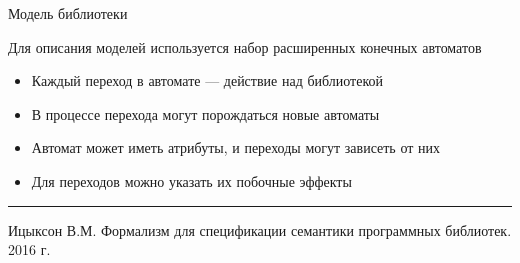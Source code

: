\documentclass[12pt]{beamer}
\begin{document}
{
\begin{frame}{Модель библиотеки}
  \begin{mybox}[]
  Для описания моделей используется набор расширенных конечных автоматов
  \begin{itemize}
  	\item Каждый переход в автомате --- действие над библиотекой
  	\item В процессе перехода могут порождаться новые автоматы
  	\item Автомат может иметь атрибуты, и переходы могут зависеть от них
  	\item Для переходов можно указать их побочные эффекты
  \end{itemize}
  \noindent\rule{4cm}{0.4pt}
  
  \begingroup
  \tiny
    	Ицыксон В.М. Формализм для спецификации семантики программных библиотек. 2016 г.
  \endgroup
  \end{mybox}
\end{frame}
}

\end{document}
